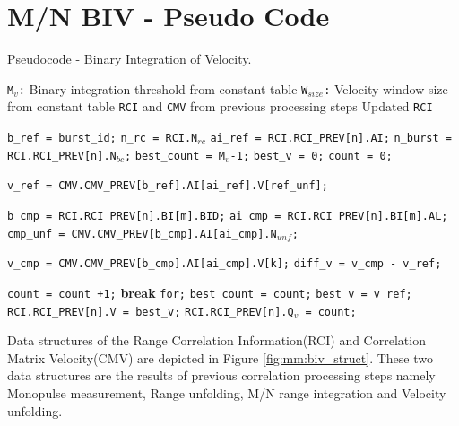 \section{M/N BIV - Pseudo Code}
\begin{algorithm}
\caption{Pseudocode - Binary Integration of Velocity\cite{fcas}.}
\label{mm:biv:pseudo_code}
\begin{algorithmic}[1]
	\Require 
		\Statex \texttt{M$_v$:} Binary integration threshold from constant table
		\Statex \texttt{W$_{size}$:} Velocity window size from constant table
		\Statex \texttt{RCI} and \texttt{CMV} from previous processing steps
	\Ensure
		\Statex Updated \texttt{RCI}
		\Statex

	\LState \texttt{b\_ref = burst\_id;}
	\LState \texttt{n\_rc = RCI.N$_{rc}$}
		\LState \texttt{ai\_ref = RCI.RCI\_PREV[n].AI;}
		\LState \texttt{n\_burst = RCI.RCI\_PREV[n].N$_{bc}$;}
		\LState \texttt{best\_count = M$_v$-1;}
		\LState \texttt{best\_v = 0;}
		\LState \texttt{count = 0;}
		
			\LState \texttt{v\_ref = CMV.CMV\_PREV[b\_ref].AI[ai\_ref].V[ref\_unf];}
			
				\LState \texttt{b\_cmp = RCI.RCI\_PREV[n].BI[m].BID;}
				\LState \texttt{ai\_cmp = RCI.RCI\_PREV[n].BI[m].AL;}
				\LState \texttt{cmp\_unf =  CMV.CMV\_PREV[b\_cmp].AI[ai\_cmp].N$_{unf}$;}
				
					\LState \texttt{v\_cmp = CMV.CMV\_PREV[b\_cmp].AI[ai\_cmp].V[k];}
					\LState \texttt{diff\_v = v\_cmp - v\_ref;}
					
						\LState \texttt{count = count +1;}
						\LState \textbf{break } \texttt{for;}
					\EndIf
				\EndFor
			\EndFor
				\LState \texttt{best\_count = count;}
				\LState \texttt{best\_v = v\_ref;}
			\EndIf
		\EndFor
		\LState \texttt{RCI.RCI\_PREV[n].V = best\_v;}
		\LState \texttt{RCI.RCI\_PREV[n].Q$_v$ = count;}
	\EndFor
\end{algorithmic}
\end{algorithm}
Data structures of the Range Correlation Information(RCI) and Correlation Matrix Velocity(CMV) are depicted in Figure \ref{fig:mm:biv_struct}. These two data structures are the results of previous correlation processing steps namely Monopulse measurement, Range unfolding, M/N range integration and Velocity unfolding.
